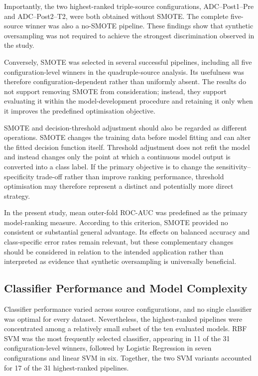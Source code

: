 \documentclass[12pt,twocolumn]{article}
\begin{document}
Importantly, the two highest-ranked triple-source configurations,
ADC--Post1--Pre and ADC--Post2--T2, were both obtained without
SMOTE. The complete five-source winner was also a no-SMOTE pipeline.
These findings show that synthetic oversampling was not required to
achieve the strongest discrimination observed in the study.

Conversely, SMOTE was selected in several successful pipelines,
including all five configuration-level winners in the
quadruple-source analysis. Its usefulness was therefore
configuration-dependent rather than uniformly absent. The results do
not support removing SMOTE from consideration; instead, they support
evaluating it within the model-development procedure and retaining it
only when it improves the predefined optimisation objective.

SMOTE and decision-threshold adjustment should also be regarded as
different operations. SMOTE changes the training data before model
fitting and can alter the fitted decision function itself. Threshold
adjustment does not refit the model and instead changes only the point
at which a continuous model output is converted into a class label.
If the primary objective is to change the sensitivity--specificity
trade-off rather than improve ranking performance, threshold
optimisation may therefore represent a distinct and potentially more
direct strategy.

In the present study, mean outer-fold ROC-AUC was predefined as the
primary model-ranking measure. According to this criterion, SMOTE
provided no consistent or substantial general advantage. Its effects
on balanced accuracy and class-specific error rates remain relevant,
but these complementary changes should be considered in relation to
the intended application rather than interpreted as evidence that
synthetic oversampling is universally beneficial.









\subsection{Classifier Performance and Model Complexity}
\label{subsec:discussion_classifiers}

Classifier performance varied across source configurations, and no
single classifier was optimal for every dataset. Nevertheless, the
highest-ranked pipelines were concentrated among a relatively small
subset of the ten evaluated models. RBF SVM was the most frequently
selected classifier, appearing in 11 of the 31 configuration-level
winners, followed by Logistic Regression in seven configurations and
linear SVM in six. Together, the two SVM variants accounted for 17
of the 31 highest-ranked pipelines.
\end{document}
